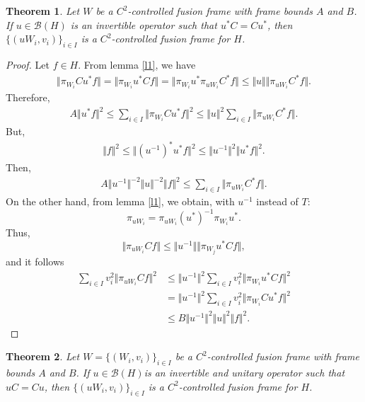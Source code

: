 \documentclass{mfatshort}
\newtheorem{theorem}{Theorem}[section]
\begin{document}
\begin{theorem}
Let $W$ be a $C^{2}$-controlled fusion frame with frame bounds $A$ and $B$. If $u \in \mathcal{B}(H)$ is an invertible  operator such that $u^*C=Cu^*$, then
$\lbrace(uW_{i},v_{i})\rbrace _{i \in I}$ is a $C^{2}$-controlled
fusion frame for $H$.
\end{theorem}
\begin{proof}
Let $f\in H$. From lemma \ref{l1}, we have
\begin{align*}
\Vert\pi_{W_i}Cu^*f\Vert=\Vert\pi_{W_i}u^*Cf\Vert=\Vert\pi_{W_i}u^*\pi_{uW_i}C^*f\Vert\leq
\Vert u\Vert \Vert \pi_{uW_i}C^*f\Vert.
\end{align*}
Therefore,
\begin{align*}
A\Vert u^*f\Vert^2\leq\sum_{i\in I}\Vert\pi_{W_i}Cu^*f\Vert^2\leq\Vert u\Vert^2\sum_{i\in I} \Vert \pi_{uW_i}C^*f\Vert.
\end{align*}
But,
\begin{align*}
\Vert f\Vert^2\leq\Vert (u^{-1})^{*}u^*f\Vert^2\leq\Vert u^{-1}\Vert^2\Vert u^*f\Vert^2.
\end{align*}
Then,
\begin{align*}
A\Vert u^{-1}\Vert^{-2}\Vert u\Vert^{-2}\Vert f\Vert^2\leq\sum_{i\in I} \Vert \pi_{uW_i}C^*f\Vert.
\end{align*}
On the other hand, from lemma \ref{l1}, we obtain, with $u^{-1}$ instead of $T$:
$$\pi_{uW_i}=\pi_{uW_i}(u^*)^{-1}\pi_{W_i}u^*.$$
Thus,
$$\Vert\pi_{uW_i}Cf\Vert\leq\Vert u^{-1}\Vert \Vert\pi_{W_j}u^*Cf\Vert,$$
and it follows 
\begin{align*}
\sum _{i \in I} v_{i}^{2} \Vert  \pi _{uW_{i}}Cf\Vert ^{2}&\leq \Vert u^{-1}\Vert^{2}\sum _{i \in I} v_{i}^{2}\Vert
\pi _{W_{i}}u^{*}Cf\Vert ^{2}\\
&=\Vert u^{-1}\Vert^2\sum_{i\in I}v_i^2\Vert \pi_{W_i}C u^{*}f\Vert^2\\
&\leq B \Vert  u^{-1}\Vert^{2}\Vert  u \Vert^{2} \Vert f\Vert^{2}.
\end{align*}
\end{proof}
\begin{theorem}
Let $W=\lbrace(W_{i},v_{i})\rbrace _{i \in I}$ be a $C^{2}$-controlled
fusion frame with frame bounds $A$ and $B$. If $u \in \mathcal{B}(H)$is an
invertible and unitary operator such that $uC=Cu$, then
$\lbrace(uW_{i},v_{i})\rbrace _{i \in I}$ is a $C^{2}$-controlled
fusion frame for $H$.
\end{theorem}
\end{document}
